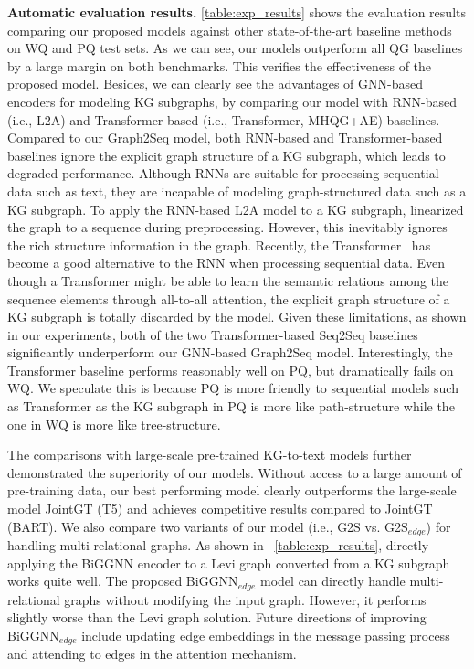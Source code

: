 \documentclass[journal]{IEEEtran}
\begin{document}
\noindent\textbf{Automatic evaluation results.}
\cref{table:exp_results} shows the evaluation results comparing our proposed models against other state-of-the-art baseline methods on WQ and PQ test sets.
As we can see, our models outperform all QG baselines by a large margin on both benchmarks.
This verifies the effectiveness of the proposed model.
Besides, we can clearly see the advantages of GNN-based encoders for modeling KG subgraphs, by comparing our model with RNN-based (i.e., L2A) and Transformer-based (i.e., Transformer, MHQG+AE) baselines.
Compared to our Graph2Seq model, both RNN-based and Transformer-based baselines ignore the explicit graph structure of a KG subgraph, which leads to degraded performance.
Although RNNs are suitable for processing sequential data such as text, they are incapable of modeling graph-structured data such as a KG subgraph.
To apply the RNN-based L2A model to a KG subgraph, 
\cite{kumar2019difficulty} linearized the graph to a sequence during preprocessing.
However, this inevitably ignores the rich structure information in the graph.
Recently, the Transformer~\cite{vaswani2017attention} has become a good alternative to the RNN when processing sequential data.
Even though a Transformer might be able to learn the semantic relations among the sequence elements through all-to-all attention, 
the explicit graph structure of a KG subgraph is totally discarded by the model.
Given these limitations, as shown in our experiments,  both of the two Transformer-based Seq2Seq baselines significantly underperform our GNN-based Graph2Seq model.
Interestingly, the Transformer baseline performs reasonably well on PQ,
but dramatically fails on WQ.
We speculate this is because PQ is more friendly to sequential models such as Transformer as the KG subgraph in PQ is more like path-structure
while the one in WQ is more like tree-structure.


The comparisons with large-scale pre-trained KG-to-text models further demonstrated the superiority of our models. Without access to a large amount of pre-training data, our best performing model clearly outperforms the large-scale model JointGT (T5) and achieves competitive results compared to JointGT (BART).
We also compare two variants of our model (i.e., G2S vs. G2S$_{edge}$) for handling multi-relational graphs.
As shown in ~\cref{table:exp_results}, directly applying the BiGGNN encoder to a Levi graph converted from a KG subgraph works quite well.
The proposed BiGGNN$_{edge}$ model can directly handle multi-relational graphs without modifying the input graph.
However, it performs slightly worse than the Levi graph solution.
Future directions of improving BiGGNN$_{edge}$ include updating edge embeddings in the message passing process and attending to edges in the attention mechanism.
\end{document}

